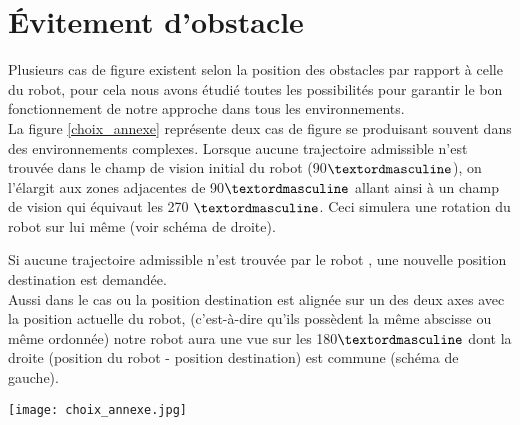 
\chapter{Évitement d'obstacle} %

\label{AppendixA} %


Plusieurs cas de figure existent selon la position des obstacles par rapport à celle du robot, pour cela nous avons étudié toutes les possibilités pour garantir le bon fonctionnement de notre approche dans tous les environnements.\\

La figure \ref{choix_annexe} représente deux cas de figure se produisant souvent dans des environnements complexes.
Lorsque aucune trajectoire admissible n'est trouvée dans le champ de vision initial du robot (90$\textordmasculine$), on l'élargit aux zones adjacentes de 90$\textordmasculine$ allant ainsi à un champ de vision qui équivaut les 270 $\textordmasculine$. Ceci simulera une rotation du robot sur lui même (voir schéma de droite).

Si aucune trajectoire admissible n'est trouvée par le robot , une nouvelle position destination est demandée.
\\

Aussi dans le cas ou la position destination est alignée sur un des deux axes avec la position actuelle du robot, (c'est-à-dire qu'ils possèdent la même abscisse ou même ordonnée) notre robot aura une vue sur les 180$\textordmasculine$ dont la droite (position du robot - position destination) est commune (schéma de gauche).
\noindent
\begin{center}	  
	\texttt{[image: choix\_annexe.jpg]}%
	\vspace{-0.1 cm}
	\label{choix_annexe}%
\end{center}

